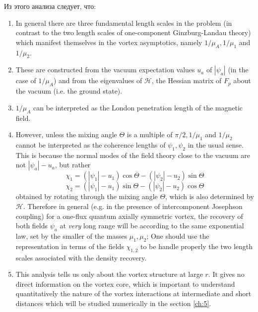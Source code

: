 Из этого анализа следует, что:
\begin{enumerate}
    \item In general there are three fundamental length scales in the problem 
        (in contrast to the two length scales of one-component Ginzburg-Landau 
        theory) which manifest themselves in the vortex asymptotics, namely 
        \( 1/\mu_A, 1/\mu_1 \) and \( 1/\mu_2 \).
    \item These are constructed from the vacuum expectation values \( u_a \) 
        of \( |\psi_a| \) (in the case of \( 1/\mu_A \)) and from the 
        eigenvalues of \( \mathcal{H} \), the Hessian matrix of \( F_p \) 
        about the vacuum (i.e. the ground state).
    \item \( 1/\mu_{A} \) can be interpreted as the London penetration length 
        of the magnetic field.
    \item However, unless the mixing angle \( \Theta \) is a multiple of 
        \( \pi/2, 1/\mu_1 \) and \( 1/\mu_2 \) cannot be interpreted as the 
        coherence lengths of \( \psi_1, \psi_2 \) in the usual sense. This is 
        because the normal modes of the field theory close to the vacuum are 
        not \( |\psi_a| - u_a \), but rather
        \[ 
            \chi_1 = (|\psi_1| - u_1)\cos\Theta - (|\psi_2| - u_2)\sin\Theta 
        \]
        \[ 
            \chi_2 = (|\psi_1| - u_1)\sin\Theta - (|\psi_2| - u_2)\cos\Theta 
        \]
        obtained by rotating through the mixing angle \( \Theta \), which is 
        also determined by \( \mathcal{H} \). Therefore in general (e.g. in 
        the presence of intercomponent Josephson coupling) for a one-flux 
        quantum axially symmetric vortex, the recovery of both fields 
        \( \psi_a \) at \emph{very} long range will be according to the same 
        exponential law, set by the smaller of the masses \( \mu_1, \mu_2 \); 
        One should use the representation in terms of the fields 
        \( \chi_{1,2} \) to be handle properly the two length scales 
        associated with the density recovery.
    \item This analysis tells us only about the vortex structure at large 
        \( r \). It gives no direct information on the vortex core, which is 
        important to understand quantitatively the nature of the vortex 
        interactions at intermediate and short distances which will be 
        studied numerically in the section \ref{ch:5}.
\end{enumerate}

